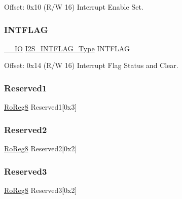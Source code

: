 Offset\+: 0x10 (R/W 16) Interrupt Enable Set. 

\mbox{\label{struct_i2s_aca78dfc860812144e72e270a7d59711d}} 
\subsubsection{\texorpdfstring{INTFLAG}{INTFLAG}}
{\footnotesize\ttfamily \mbox{\hyperlink{core__cm0plus_8h_aec43007d9998a0a0e01faede4133d6be}{\+\_\+\+\_\+\+IO}} \mbox{\hyperlink{union_i2_s___i_n_t_f_l_a_g___type}{I2\+S\+\_\+\+I\+N\+T\+F\+L\+A\+G\+\_\+\+Type}} I\+N\+T\+F\+L\+AG}



Offset\+: 0x14 (R/W 16) Interrupt Flag Status and Clear. 

\mbox{\label{struct_i2s_a0ec4ccebd5bfbf4f17510e15a5a9ff81}} 
\subsubsection{\texorpdfstring{Reserved1}{Reserved1}}
{\footnotesize\ttfamily \mbox{\hyperlink{group___s_a_m_d21_e15_a__definitions_ga0d957f1433aaf5d70e4dc2b68288442d}{Ro\+Reg8}} Reserved1\mbox{[}0x3\mbox{]}}

\mbox{\label{struct_i2s_a39c013121a741bab8d9442a891da19a7}} 
\subsubsection{\texorpdfstring{Reserved2}{Reserved2}}
{\footnotesize\ttfamily \mbox{\hyperlink{group___s_a_m_d21_e15_a__definitions_ga0d957f1433aaf5d70e4dc2b68288442d}{Ro\+Reg8}} Reserved2\mbox{[}0x2\mbox{]}}

\mbox{\label{struct_i2s_ad07c4ef2ff7a794403c53387495e8d6d}} 
\subsubsection{\texorpdfstring{Reserved3}{Reserved3}}
{\footnotesize\ttfamily \mbox{\hyperlink{group___s_a_m_d21_e15_a__definitions_ga0d957f1433aaf5d70e4dc2b68288442d}{Ro\+Reg8}} Reserved3\mbox{[}0x2\mbox{]}}

